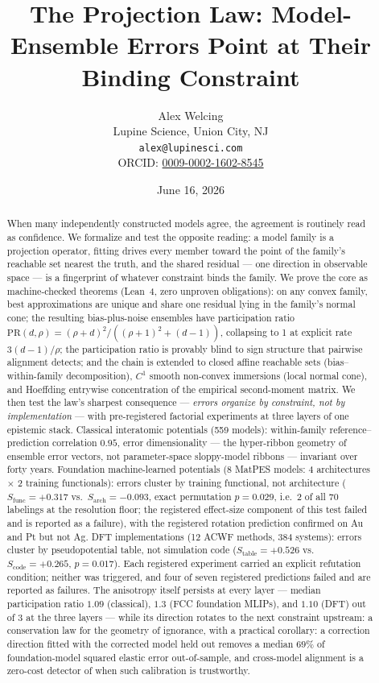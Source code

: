 \documentclass[11pt]{article}
\title{\bfseries The Projection Law: Model-Ensemble Errors Point at Their Binding Constraint}
\author{Alex Welcing\\ \small Lupine Science, Union City, NJ\\ \small \texttt{alex@lupinesci.com}\\ \small ORCID: \href{https://orcid.org/0009-0002-1602-8545}{0009-0002-1602-8545}}
\date{June 16, 2026}
\begin{document}
\maketitle

\begin{abstract}
\noindent When many independently constructed models agree, the agreement is
routinely read as confidence. We formalize and test the opposite reading: a
model family is a projection operator, fitting drives every member toward the
point of the family's reachable set nearest the truth, and the shared residual
--- one direction in observable space --- is a fingerprint of whatever
constraint binds the family. We prove the core as machine-checked theorems
(Lean~4, zero unproven obligations): on any convex family, best approximations
are unique and share one residual lying in the family's normal cone; the
resulting bias-plus-noise ensembles have participation ratio
$\mathrm{PR}(d,\rho) = (\rho+d)^2/((\rho+1)^2+(d-1))$, collapsing to 1 at
explicit rate $3(d-1)/\rho$; the participation ratio is provably blind to
sign structure that pairwise alignment detects; and the chain is extended to
closed affine reachable sets (bias--within-family decomposition), $C^1$ smooth
non-convex immersions (local normal cone), and Hoeffding entrywise concentration of
the empirical second-moment matrix. We then test the law's sharpest
consequence --- \emph{errors organize by constraint, not by implementation} ---
with pre-registered factorial experiments at three layers of one epistemic
stack. Classical interatomic potentials (559 models): within-family
reference--prediction correlation $0.95$, error dimensionality --- the
hyper-ribbon geometry of ensemble error vectors, not parameter-space
sloppy-model ribbons --- invariant over forty years. Foundation machine-learned potentials (8 MatPES models: 4
architectures $\times$ 2 training functionals): errors cluster by training
functional, not architecture ($S_{\mathrm{func}}{=}{+}0.317$ vs.\
$S_{\mathrm{arch}}{=}{-}0.093$, exact permutation $p{=}0.029$, i.e.\ 2 of all 70 labelings at the resolution floor; the registered
effect-size component of this test failed and is reported as a failure), with
the registered rotation prediction confirmed on Au and Pt but not Ag. DFT
implementations (12 ACWF methods, 384 systems): errors cluster by
pseudopotential table, not simulation code
($S_{\mathrm{table}}{=}{+}0.526$ vs.\ $S_{\mathrm{code}}{=}{+}0.265$,
$p{=}0.017$). Each registered experiment carried an explicit refutation
condition; neither was triggered, and four of seven registered predictions
failed and are reported as failures. The anisotropy itself persists at every
layer --- median participation ratio $1.09$ (classical), $1.3$ (FCC foundation MLIPs), and $1.10$ (DFT) out of 3
at the three layers --- while its direction rotates to the next constraint
upstream: a conservation law for the geometry of ignorance, with a practical
corollary: a correction direction fitted with the corrected model held out
removes a median $69\%$ of foundation-model squared elastic error
out-of-sample, and cross-model alignment is a zero-cost detector of when such
calibration is trustworthy.
\end{abstract}
\end{document}
